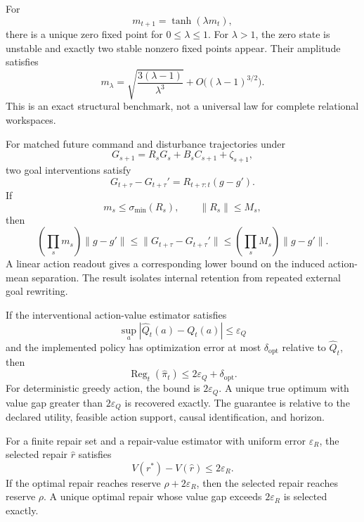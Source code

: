 
For
\[
m_{t+1}=\tanh(\lambda m_t),
\]
there is a unique zero fixed point for \(0\leq\lambda\leq1\). For
\(\lambda>1\), the zero state is unstable and exactly two stable nonzero fixed
points appear. Their amplitude satisfies
\[
\boxed{
m_\lambda
=
\sqrt{\frac{3(\lambda-1)}{\lambda^3}}
+
O\bigl((\lambda-1)^{3/2}\bigr).
}
\]
This is an exact structural benchmark, not a universal law for complete
relational workspaces.


For matched future command and disturbance trajectories under
\[
G_{s+1}=R_sG_s+B_sC_{s+1}+\zeta_{s+1},
\]
two goal interventions satisfy
\[
\boxed{
G_{t+\tau}-G_{t+\tau}'
=
R_{t+\tau:t}(g-g').
}
\]
If
\[
m_s\leq\sigma_{\min}(R_s),
\qquad
\|R_s\|\leq M_s,
\]
then
\[
\boxed{
\left(\prod_s m_s\right)\|g-g'\|
\leq
\|G_{t+\tau}-G_{t+\tau}'\|
\leq
\left(\prod_s M_s\right)\|g-g'\|.
}
\]
A linear action readout gives a corresponding lower bound on the induced
action-mean separation. The result isolates internal retention from repeated
external goal rewriting.


If the interventional action-value estimator satisfies
\[
\sup_a|\widehat Q_t(a)-Q_t(a)|\leq\varepsilon_Q
\]
and the implemented policy has optimization error at most
\(\delta_{\mathrm{opt}}\) relative to \(\widehat Q_t\), then
\[
\boxed{
\operatorname{Reg}_t(\widehat\pi_t)
\leq
2\varepsilon_Q+\delta_{\mathrm{opt}}.
}
\]
For deterministic greedy action, the bound is \(2\varepsilon_Q\). A unique
true optimum with value gap greater than \(2\varepsilon_Q\) is recovered
exactly. The guarantee is relative to the declared utility, feasible action
support, causal identification, and horizon.


For a finite repair set and a repair-value estimator with uniform error
\(\varepsilon_R\), the selected repair \(\widehat r\) satisfies
\[
\boxed{
V(r^*)-V(\widehat r)
\leq
2\varepsilon_R.
}
\]
If the optimal repair reaches reserve \(\rho+2\varepsilon_R\), then the selected
repair reaches reserve \(\rho\). A unique optimal repair whose value gap
exceeds \(2\varepsilon_R\) is selected exactly.


